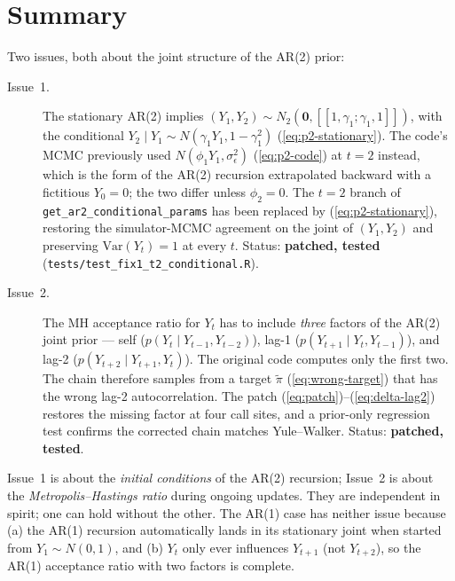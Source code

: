 \documentclass[11pt]{article}
\newcommand{\bZero}{\boldsymbol{0}}
\newcommand{\eref}[1]{(\ref{#1})}
\theoremstyle{plain}
\theoremstyle{definition}
\theoremstyle{remark}
\begin{document}
\section{Summary}\label{sec:summary}

Two issues, both about the joint structure of the AR(2) prior:

\begin{description}
  \item[Issue~1.] The stationary AR(2) implies
        $(Y_1, Y_2) \sim N_2(\bZero, [\![1, \gamma_1; \gamma_1, 1]\!])$,
        with the conditional
        $Y_2 \mid Y_1 \sim N(\gamma_1 Y_1, 1 - \gamma_1^2)$ \eref{eq:p2-stationary}.
        The code's MCMC previously used $N(\phi_1 Y_1, \sigma_\epsilon^2)$
        \eref{eq:p2-code} at $t = 2$ instead, which is the form of the
        AR(2) recursion extrapolated backward with a fictitious $Y_0 = 0$;
        the two differ unless $\phi_2 = 0$. The $t = 2$ branch of
        \texttt{get\_ar2\_conditional\_params} has been replaced by
        \eref{eq:p2-stationary}, restoring the simulator-MCMC agreement
        on the joint of $(Y_1, Y_2)$ and preserving
        $\mathrm{Var}(Y_t) = 1$ at every $t$. Status: \textbf{patched,
        tested} (\texttt{tests/test\_fix1\_t2\_conditional.R}).

  \item[Issue~2.] The MH acceptance ratio for $Y_t$ has to include
        \emph{three} factors of the AR(2) joint prior --- self
        ($p(Y_t \mid Y_{t-1}, Y_{t-2})$), lag-1
        ($p(Y_{t+1} \mid Y_t, Y_{t-1})$), and lag-2
        ($p(Y_{t+2} \mid Y_{t+1}, Y_t)$). The original code computes only
        the first two. The chain therefore samples from a target
        $\widetilde\pi$ \eref{eq:wrong-target} that has the wrong lag-2
        autocorrelation. The patch \eref{eq:patch}--\eref{eq:delta-lag2}
        restores the missing factor at four call sites, and a prior-only
        regression test confirms the corrected chain matches
        Yule--Walker. Status: \textbf{patched, tested}.
\end{description}

Issue~1 is about the \emph{initial conditions} of the AR(2) recursion;
Issue~2 is about the \emph{Metropolis--Hastings ratio} during ongoing
updates. They are independent in spirit; one can hold without the other.
The AR(1) case has neither issue because (a) the AR(1) recursion
automatically lands in its stationary joint when started from
$Y_1 \sim N(0,1)$, and (b) $Y_t$ only ever influences $Y_{t+1}$ (not
$Y_{t+2}$), so the AR(1) acceptance ratio with two factors is complete.



\end{document}
